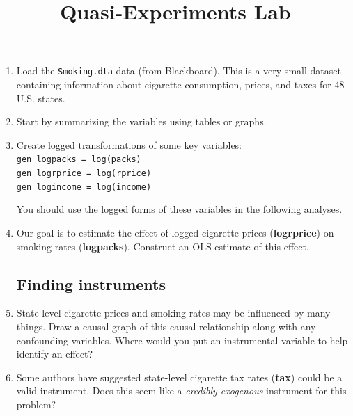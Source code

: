 \documentclass[a4paper,12pt]{article}
\title{Quasi-Experiments Lab}
\author{}
\date{}
\begin{document}
\maketitle

\vspace{-4em}

\begin{enumerate}\itemsep0.5em

\section*{Instrumental Variables}

\item Load the \texttt{Smoking.dta} data (from Blackboard). This is a very small dataset containing information about cigarette consumption, prices, and taxes for 48 U.S. states.

\item Start by summarizing the variables using tables or graphs.

\item Create logged transformations of some key variables:\\
\texttt{gen logpacks = log(packs)\\
gen logrprice = log(rprice)\\
gen logincome = log(income)}

You should use the logged forms of these variables in the following analyses.

\item Our goal is to estimate the effect of logged cigarette prices (\textbf{logrprice}) on smoking rates (\textbf{logpacks}). Construct an OLS estimate of this effect.

\subsection*{Finding instruments}

\item State-level cigarette prices and smoking rates may be influenced by many things. Draw a causal graph of this causal relationship along with any confounding variables. Where would you put an instrumental variable to help identify an effect?

\item Some authors have suggested state-level cigarette tax rates (\textbf{tax}) could be a valid instrument. Does this seem like a {\em credibly exogenous} instrument for this problem?


\end{enumerate}
\end{document}
